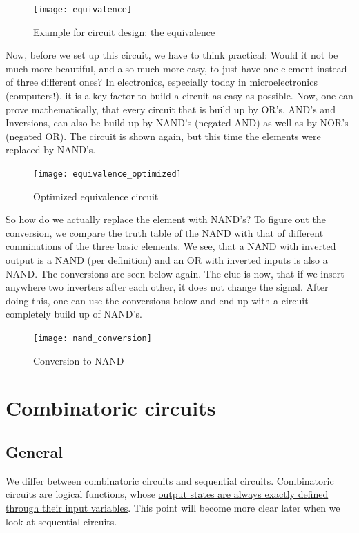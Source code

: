 \begin{figure}[H]
\centering
  \texttt{[image: equivalence]}%
  \caption{Example for circuit design: the equivalence}%
  \label{fig:equivalence}
\end{figure}

\noindent
Now, before we set up this circuit, we have to think practical: Would it not be much more beautiful, and also much more easy, to just have one element instead of three different ones? In electronics, especially today in microelectronics (computers!), it is a key factor to build a circuit as easy as possible. Now, one can prove mathematically, that every circuit that is build up by OR's, AND's and Inversions, can also be build up by NAND's (negated AND) as well as by NOR's (negated OR). The circuit is shown again, but this time the elements were replaced by NAND's. 

\begin{figure}[H]
\centering
  \texttt{[image: equivalence\_optimized]}%
  \caption{Optimized equivalence circuit}%
  \label{fig:equivalence_optimized}
\end{figure}

So how do we actually replace the element with NAND's? To figure out the conversion, we compare the truth table of the NAND with that of different conminations of the three basic elements. We see, that a NAND with inverted output is a NAND (per definition) and an OR with inverted inputs is also a NAND. The conversions are seen below again. The clue is now, that if we insert anywhere two inverters after each other, it does not change the signal. After doing this, one can use the conversions below and end up with a circuit completely build up of NAND's. 

\begin{figure}[H]
\centering
  \texttt{[image: nand\_conversion]}%
  \caption{Conversion to NAND}%
  \label{fig:nand_conversion}
\end{figure}

\section{Combinatoric circuits}
\subsection{General}
We differ between combinatoric circuits and sequential circuits. Combinatoric circuits are logical functions, whose \underline{output states are always exactly defined through their input variables}. This point will become more clear later when we look at sequential circuits. 

